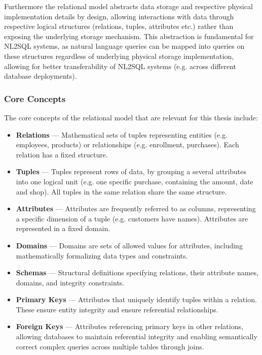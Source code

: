 \documentclass{article}
\begin{document}
Furthermore the relational model abstracts data storage and respective physical implementation details by design,
allowing interactions with data through respective logical structures (relations, tuples, attributes etc.) rather than
exposing the underlying storage mechanism. This abstraction is fundamental for NL2SQL systems, as natural language
queries can be mapped into queries on these structures regardless of underlying physical storage implementation,
allowing for better transferability of NL2SQL systems (e.g. across different database deployments).

\subsubsection{Core Concepts}

The core concepts of the relational model that are relevant for this thesis include:

\begin{itemize}
    \item \textbf{Relations} — Mathematical sets of tuples representing entities (e.g. employees, products) or
          relationships (e.g. enrollment, purchases). Each relation has a fixed structure.
    \item \textbf{Tuples} — Tuples represent rows of data, by grouping a several attributes into one logical unit
          (e.g. one specific purchase, containing the amount, date and shop). All tuples in the same relation share
          the same structure.
    \item \textbf{Attributes} — Attributes are frequently referred to as columns, representing a specific dimension
          of a tuple (e.g. customers have names). Attributes are represented in a fixed domain.
    \item \textbf{Domains} — Domains are sets of allowed values for attributes, including mathematically formalizing
          data types and constraints.
    \item \textbf{Schemas} — Structural definitions specifying relations, their attribute names, domains, and integrity
          constraints.
    \item \textbf{Primary Keys} — Attributes that uniquely identify tuples within a relation. These
          ensure entity integrity and ensure referential relationships.
    \item \textbf{Foreign Keys} — Attributes referencing primary keys in other relations, allowing databases to maintain
          referential integrity and enabling semantically correct complex queries across multiple tables through joins.
\end{itemize}
\end{document}
